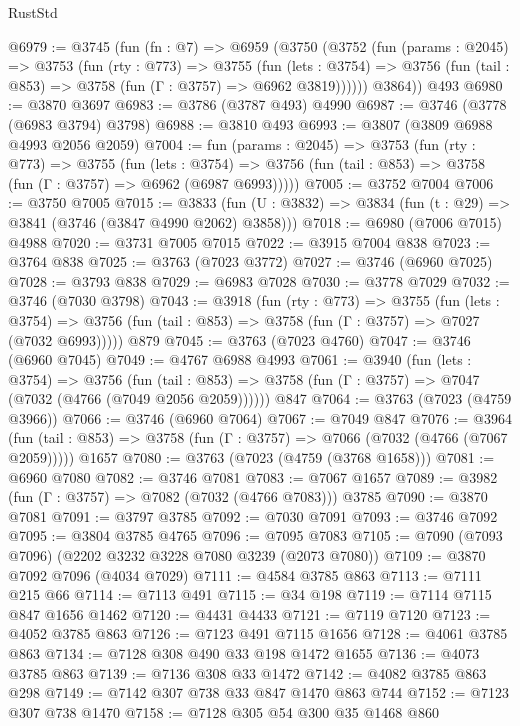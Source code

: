 \begin{lexlean}{RustStd}
\begin{coremodule}
@6979 := @3745
    (fun (fn : @7) =>
    @6959
      (@3750
        (@3752
          (fun (params : @2045) =>
          @3753
            (fun (rty : @773) =>
            @3755
              (fun (lets : @3754) =>
              @3756 (fun (tail : @853) => @3758 (fun (Γ : @3757) => @6962 @3819))))))
        @3864))
    @493
@6980 := @3870 @3697
@6983 := @3786 (@3787 @493) @4990
@6987 := @3746 (@3778 (@6983 @3794) @3798)
@6988 := @3810 @493
@6993 := @3807 (@3809 @6988 @4993 @2056 @2059)
@7004 := fun (params : @2045) =>
  @3753
    (fun (rty : @773) =>
    @3755
      (fun (lets : @3754) =>
      @3756 (fun (tail : @853) => @3758 (fun (Γ : @3757) => @6962 (@6987 @6993)))))
@7005 := @3752 @7004
@7006 := @3750 @7005
@7015 := @3833 (fun (U : @3832) => @3834 (fun (t : @29) => @3841 (@3746 (@3847 @4990 @2062) @3858)))
@7018 := @6980 (@7006 @7015) @4988
@7020 := @3731 @7005 @7015
@7022 := @3915 @7004 @838
@7023 := @3764 @838
@7025 := @3763 (@7023 @3772)
@7027 := @3746 (@6960 @7025)
@7028 := @3793 @838
@7029 := @6983 @7028
@7030 := @3778 @7029
@7032 := @3746 (@7030 @3798)
@7043 := @3918
    (fun (rty : @773) =>
    @3755
      (fun (lets : @3754) =>
      @3756 (fun (tail : @853) => @3758 (fun (Γ : @3757) => @7027 (@7032 @6993)))))
    @879
@7045 := @3763 (@7023 @4760)
@7047 := @3746 (@6960 @7045)
@7049 := @4767 @6988 @4993
@7061 := @3940
    (fun (lets : @3754) =>
    @3756
      (fun (tail : @853) => @3758 (fun (Γ : @3757) => @7047 (@7032 (@4766 (@7049 @2056 @2059))))))
    @847
@7064 := @3763 (@7023 (@4759 @3966))
@7066 := @3746 (@6960 @7064)
@7067 := @7049 @847
@7076 := @3964
    (fun (tail : @853) => @3758 (fun (Γ : @3757) => @7066 (@7032 (@4766 (@7067 @2059)))))
    @1657
@7080 := @3763 (@7023 (@4759 (@3768 @1658)))
@7081 := @6960 @7080
@7082 := @3746 @7081
@7083 := @7067 @1657
@7089 := @3982 (fun (Γ : @3757) => @7082 (@7032 (@4766 @7083))) @3785
@7090 := @3870 @7081
@7091 := @3797 @3785
@7092 := @7030 @7091
@7093 := @3746 @7092
@7095 := @3804 @3785 @4765
@7096 := @7095 @7083
@7105 := @7090 (@7093 @7096) (@2202 @3232 @3228 @7080 @3239 (@2073 @7080))
@7109 := @3870 @7092 @7096 (@4034 @7029)
@7111 := @4584 @3785 @863
@7113 := @7111 @215 @66
@7114 := @7113 @491
@7115 := @34 @198
@7119 := @7114 @7115 @847 @1656 @1462
@7120 := @4431 @4433
@7121 := @7119 @7120
@7123 := @4052 @3785 @863
@7126 := @7123 @491 @7115 @1656
@7128 := @4061 @3785 @863
@7134 := @7128 @308 @490 @33 @198 @1472 @1655
@7136 := @4073 @3785 @863
@7139 := @7136 @308 @33 @1472
@7142 := @4082 @3785 @863 @298
@7149 := @7142 @307 @738 @33 @847 @1470 @863 @744
@7152 := @7123 @307 @738 @1470
@7158 := @7128 @305 @54 @300 @35 @1468 @860

\end{coremodule}
\end{lexlean}
